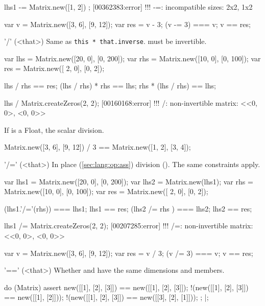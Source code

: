 \begin{urbiscriptapi}
\begin{urbiassert}
lhs1 -= Matrix.new([1, 2]) ;
[00362383:error] !!! -=: incompatible sizes: 2x2, 1x2
\end{urbiassert}

\begin{urbiassert}
var v = Matrix.new([3, 6], [9, 12]);
var res = v - 3;
(v -= 3) === v; v == res;
\end{urbiassert}


\item['/'](<that>)%
  Same as \lstinline|this * that.inverse|.  \that must be invertible.
\begin{urbiassert}
var lhs = Matrix.new([20, 0], [0, 200]);
var rhs = Matrix.new([10, 0], [0, 100]);
var res = Matrix.new([ 2, 0], [0,   2]);

lhs / rhs == res;
(lhs / rhs) * rhs == lhs;
rhs * (lhs / rhs) == lhs;

lhs / Matrix.createZeros(2, 2);
[00160168:error] !!! /: non-invertible matrix: <<0, 0>, <0, 0>>
\end{urbiassert}

  If \that is a Float, the scalar division.
\begin{urbiassert}
Matrix.new([3, 6], [9, 12]) / 3 == Matrix.new([1, 2], [3, 4]);
\end{urbiassert}


\item['/='](<that>)%
  In place (\autoref{sec:lang:op:ass}) division ().  The same
  constraints apply.
\begin{urbiassert}
var lhs1 = Matrix.new([20, 0], [0, 200]);
var lhs2 = Matrix.new(lhs1);
var rhs = Matrix.new([10, 0], [0, 100]);
var res = Matrix.new([ 2, 0], [0,   2]);

(lhs1.'/='(rhs)) === lhs1;  lhs1 == res;
(lhs2  /=  rhs ) === lhs2;  lhs2 == res;

lhs1 /= Matrix.createZeros(2, 2);
[00207285:error] !!! /=: non-invertible matrix: <<0, 0>, <0, 0>>
\end{urbiassert}

\begin{urbiassert}
var v = Matrix.new([3, 6], [9, 12]);
var res = v / 3;
(v /= 3) === v; v == res;
\end{urbiassert}


\item['=='](<that>)%
  Whether \this and \that have the same dimensions and members.
\begin{urbiscript}
do (Matrix)
{
  assert
  {
      new([[1], [2], [3]]) == new([[1], [2], [3]]);
    !(new([[1], [2], [3]]) == new([[1], [2]]));
    !(new([[1], [2], [3]]) == new([[3], [2], [1]]));
  };
}|;
\end{urbiscript}



\end{urbiscriptapi}
